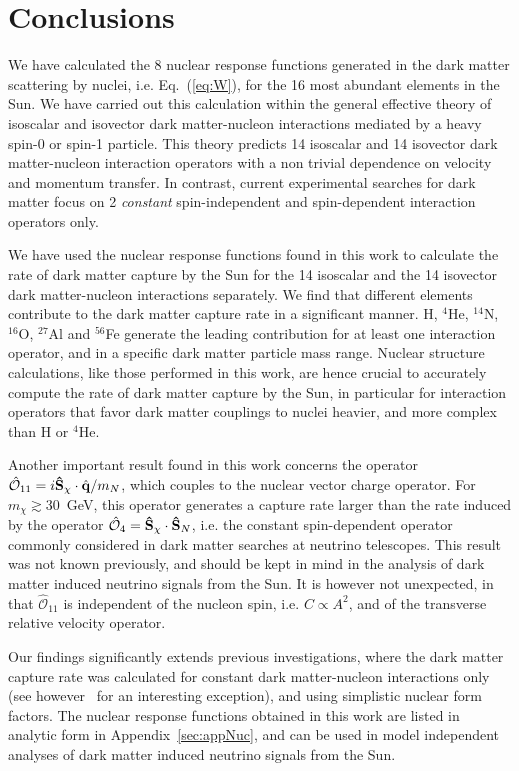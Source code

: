 \documentclass[11pt,a4paper]{article}
\begin{document}
\section{Conclusions}
\label{sec:conc}
We have calculated the 8 nuclear response functions generated in the dark matter scattering by nuclei, i.e. Eq.~(\ref{eq:W}), for the 16 most abundant elements in the Sun. We have carried out this calculation within the general effective theory of isoscalar and isovector dark matter-nucleon interactions mediated by a heavy spin-0 or spin-1 particle. This theory predicts 14 isoscalar and 14 isovector dark matter-nucleon interaction operators with a non trivial dependence on velocity and momentum transfer. In contrast, current experimental searches for dark matter focus on 2 {\it constant} spin-independent and spin-dependent interaction operators only.

We have used the nuclear response functions found in this work to calculate the rate of dark matter capture by the Sun for the 14 isoscalar and the 14 isovector dark matter-nucleon interactions separately. We find that different elements contribute to the dark matter capture rate in a significant manner. H, $^{4}$He, $^{14}$N, $^{16}$O, $^{27}$Al and $^{56}$Fe generate the leading contribution for at least one interaction operator, and in a specific dark matter particle mass range. Nuclear structure calculations, like those performed in this work, are hence crucial to accurately compute the rate of dark matter capture by the Sun, in particular for interaction operators that favor dark matter couplings to nuclei heavier, and more complex than H or $^{4}$He. 

Another important result found in this work concerns the operator $\hat{\mathcal{O}}_{11} = i{\bf{\hat{S}}}_\chi\cdot{\hat{\bf{q}}}/m_N$, which couples to the nuclear vector charge operator. For $m_\chi\gtrsim30$~GeV, this operator generates a capture rate larger than the rate induced by the operator $\hat{\mathcal{O}}_{4} = {\bf{\hat{S}}}_\chi\cdot{\bf{\hat{S}}}_N $, i.e. the constant spin-dependent operator commonly considered in dark matter searches at neutrino telescopes. This result was not known previously, and should be kept in mind in the analysis of dark matter induced neutrino signals from the Sun. It is however not unexpected, in that $\hat{\mathcal{O}}_{11}$ is independent of the nucleon spin, i.e. $C\propto A^2$, and of the transverse relative velocity operator.

Our findings significantly extends previous investigations, where the dark matter capture rate was calculated for constant dark matter-nucleon interactions only (see however~\cite{Liang:2013dsa} for an interesting exception), and using simplistic nuclear form factors. The nuclear response functions obtained in this work are listed in analytic form in Appendix~\ref{sec:appNuc}, and can be used in model independent analyses of dark matter induced neutrino signals from the Sun. 
\end{document}
